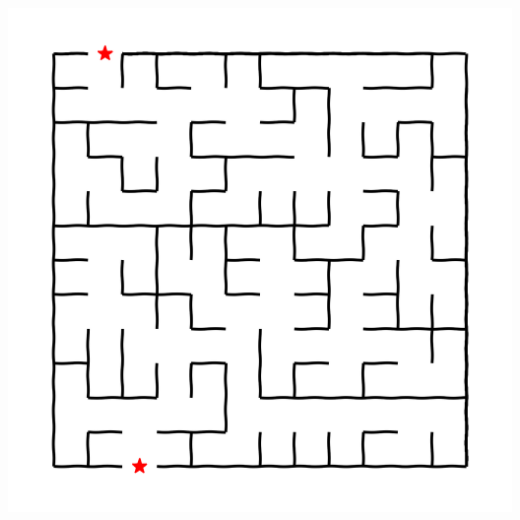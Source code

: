\documentclass[landscape]{article}
\begin{document}
\begin{multicols}{3}
\center\includegraphics[width=0.95\linewidth]{images/maze_r.png}
\renewcommand*\sudokuformat[1]{\sffamily#1}
\setlength{}
\setlength\sudokuthickline{1pt}
\begin{center}
	
\end{center}

% 	

\end{multicols}
\end{document}
